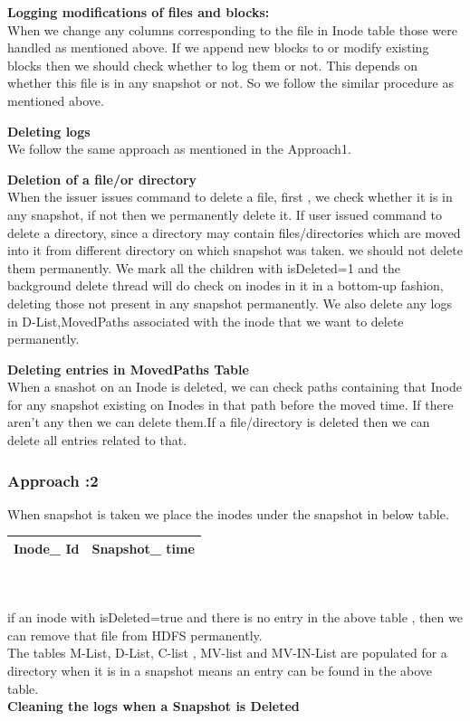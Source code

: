 \textbf{Logging modifications of files and blocks:}\\
When we change any columns corresponding to the file in Inode table those were handled as mentioned above. If we append new blocks to or modify existing blocks then we should check whether to log them or not. This depends on whether this file is in any snapshot or not. So we follow the similar procedure as mentioned above.

\textbf{Deleting logs}\\
 We follow the same approach as mentioned in the Approach1.

\textbf{Deletion of a file/or directory}\\
When the issuer issues command to delete a file, first , we check whether it is in any snapshot, if not then we permanently delete it. If user issued command to delete a directory, since a directory may contain files/directories which are moved into it from different directory on which snapshot was taken. we should not delete them permanently. We mark all the children with isDeleted=1 and the background delete thread will do check on inodes in it in a bottom-up fashion, deleting those not present in any snapshot permanently.
 We also delete any logs in  D-List,MovedPaths associated with the inode that we want to delete permanently.

\textbf{Deleting entries in MovedPaths Table}\\
When a snashot on an Inode is deleted, we can check paths containing that Inode for any snapshot existing on Inodes in that path before the moved time. If there aren’t any then we can delete them.If a file/directory is deleted then we can delete all entries related to that. 

\subsubsection{Approach :2}
When snapshot is taken we place the inodes under the snapshot in below table.

\begin{tabular}{|c|c|}
\hline
Inode\_ Id&Snapshot\_ time\\
\hline
\end{tabular}\\\\
if an inode with isDeleted=true and there is no entry in the above table , then we can remove that file from HDFS permanently.\\
The tables M-List, D-List, C-list , MV-list and MV-IN-List are populated for a directory when it is in a snapshot means an entry can be found in the above table.\\
\textbf{Cleaning the logs when a Snapshot is Deleted}\\


